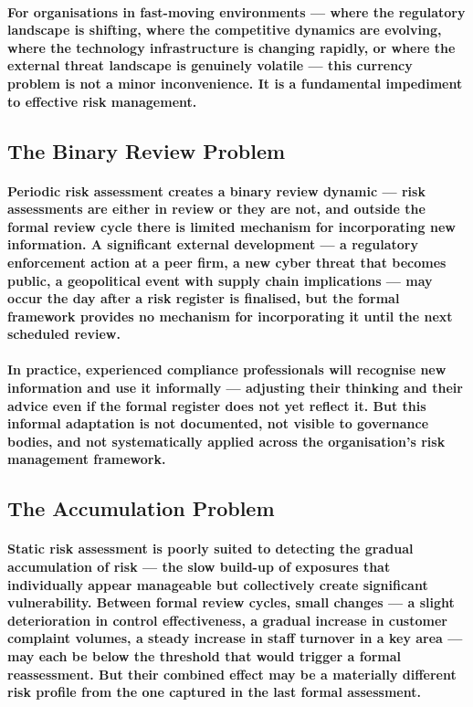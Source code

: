 \paragraph{For organisations in fast-moving environments — where the regulatory landscape is shifting, where the competitive dynamics are evolving, where the technology infrastructure is changing rapidly, or where the external threat landscape is genuinely volatile — this currency problem is not a minor inconvenience. It is a fundamental impediment to effective risk management.}

\subsection{The Binary Review Problem}
\paragraph{Periodic risk assessment creates a \textbf{binary review dynamic} — risk assessments are either in review or they are not, and outside the formal review cycle there is limited mechanism for incorporating new information. A significant external development — a regulatory enforcement action at a peer firm, a new cyber threat that becomes public, a geopolitical event with supply chain implications — may occur the day after a risk register is finalised, but the formal framework provides no mechanism for incorporating it until the next scheduled review.}
\paragraph{In practice, experienced compliance professionals will recognise new information and use it informally — adjusting their thinking and their advice even if the formal register does not yet reflect it. But this informal adaptation is not documented, not visible to governance bodies, and not systematically applied across the organisation's risk management framework.}

\subsection{The Accumulation Problem}
\paragraph{Static risk assessment is poorly suited to detecting the gradual accumulation of risk — the slow build-up of exposures that individually appear manageable but collectively create significant vulnerability. Between formal review cycles, small changes — a slight deterioration in control effectiveness, a gradual increase in customer complaint volumes, a steady increase in staff turnover in a key area — may each be below the threshold that would trigger a formal reassessment. But their combined effect may be a materially different risk profile from the one captured in the last formal assessment.}
